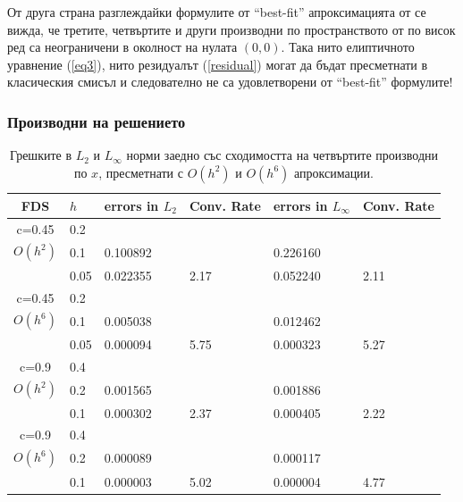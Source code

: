 \documentclass[a4paper]{article}
\newcommand{\rf}[1]{(\ref{#1})}
\theoremstyle{remark}
\begin{document}
\begin{large}
От друга страна разглеждайки формулите от ``best-fit'' апроксимацията от \cite{ref15} се вижда, че третите, четвъртите и други производни по пространството от по висок ред са неограничени в околност на нулата $(0,0)$. Така нито елиптичното уравнение \rf{eq3}, нито резидуалът \rf{residual} могат да бъдат пресметнати в класическия смисъл и следователно не са удовлетворени от ``best-fit'' формулите!

\subsubsection{Производни на решението}
\begin{center}
\begin{table}[ht]
\centering
		\begin{tabular}{||c|l|ll|ll||}
			\hline
			\hline
      FDS       & $h$ &errors in $L_2$&Conv. Rate& errors in $L_\infty$&Conv. Rate\\
   			\hline 
					\hline 
      c=0.45    	& 0.2  	&             		&             &                    &   \\
   $O(h^2)$     	& 0.1    	& 0.100892  	&             	& 0.226160 &   \\
                		& 0.05   & 0.022355  	& 2.17  		& 0.052240 &2.11 \\
               	 \hline 
      c=0.45    	& 0.2  	&             		&             &                    &   \\
   $O(h^6)$     	& 0.1    	& 0.005038  	&             &  0.012462 &   \\
                		& 0.05   & 0.000094  	& 5.75 	  &  0.000323 &5.27 \\
			\hline
			\hline 	
      c=0.9     	& 0.4  	&             		&             &                    &   \\
   $O(h^2)$     	& 0.2    	& 0.001565  	&             	&0.001886 &   \\
                		& 0.1    & 0.000302  	& 2.37  		&0.000405 &2.22 \\
               	 \hline 
      c=0.9     	& 0.4  	&             		&             &                    &   \\
   $O(h^6)$     	& 0.2    	& 0.000089  	&             & 0.000117 &   \\
                		& 0.1    & 0.000003  	& 5.02 	  & 0.000004  &4.77 \\
		   \hline
			\hline 
		\end{tabular}
		\caption{Грешките в $L_2$ и $L_\infty$ норми заедно със сходимостта на четвъртите производни по $x$, пресметнати с $O(h^2)$ и $O(h^6)$ апроксимации.}

\end{table}
\end{center}
\end{large}
\end{document}

